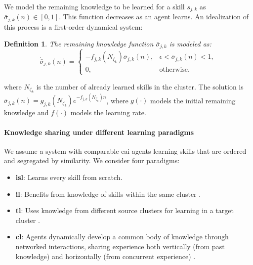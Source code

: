\documentclass[12pt]{article}
\newtheorem{definition}{Definition}
\begin{document}
We model the remaining knowledge to be learned for a skill $s_{j,k}$ as $\bar{\sigma}_{j,k}(n) \in [0,1]$. This function decreases as an agent learns. An idealization of this process is a first-order dynamical system:
\begin{definition}
The remaining knowledge function $\bar{\sigma}_{j,k}$ is modeled as:
	\begin{equation}\label{eq:simple_knowledge_dynamics_revised}
		\dot{\bar{\sigma}}_{j,k}\left(n\right)=\begin{cases}
			-f_{j,k} \left(N_{\zeta_k} \right) \bar{\sigma}_{j,k}\left(n\right), & \epsilon < \bar{\sigma}_{j,k}\left(n\right) < 1, \\
			0, & \text{otherwise}.
		\end{cases}
	\end{equation}	
\end{definition}
where $N_{\zeta_k}$ is the number of already learned skills in the cluster. The solution is $\bar{\sigma}_{j,k}(n) = g_{j,k}(N_{\zeta_k}) e^{-f_{j,k}(N_{\zeta_k}) n}$, where $g(\cdot)$ models the initial remaining knowledge and $f(\cdot)$ models the learning rate.

\paragraph*{Knowledge sharing under different learning paradigms}
We assume a system with comparable \ac{eai} agents learning skills that are ordered and segregated by similarity. We consider four paradigms:
\begin{itemize}
    \item \textbf{\Acl{isl}}: Learns every skill from scratch.
    \item \textbf{\Acl{il}}: Benefits from knowledge of skills within the same cluster \cite{Lesort2020Continuallearningrobotics}.
    \item \textbf{\Acl{tl}}: Uses knowledge from different source clusters for learning in a target cluster \cite{Hosna2022Transferlearningfriendly,Jaquier2023TransferLearningRobotics}.
    \item \textbf{\Acl{cl}}: Agents dynamically develop a common body of knowledge through networked interactions, sharing experience both vertically (from past knowledge) and horizontally (from concurrent experience) \cite{Garavan2012CollectiveLearning}.
\end{itemize}
\end{document}
